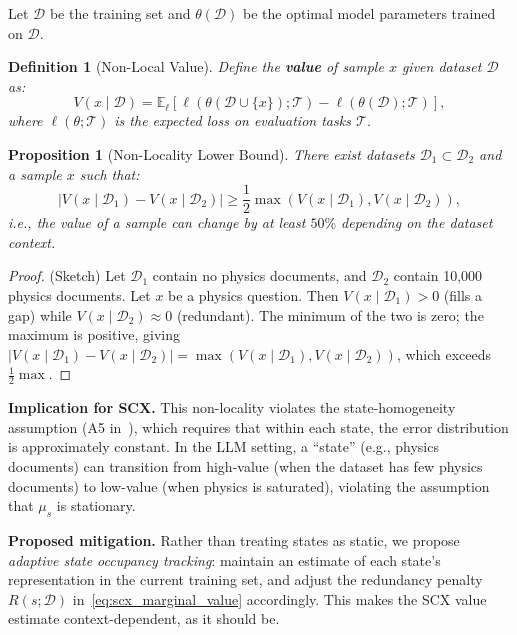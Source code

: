 \documentclass[11pt]{article}
\newtheorem{definition}{Definition}[section]
\newtheorem{proposition}{Proposition}[section]
\newcommand{\cT}{\mathcal{T}}
\begin{document}
Let $\mathcal{D}$ be the training set and $\theta(\mathcal{D})$ be the optimal model parameters trained on $\mathcal{D}$.

\begin{definition}[Non-Local Value]
Define the \textbf{value} of sample $x$ given dataset $\mathcal{D}$ as:
\begin{equation}
V(x \mid \mathcal{D}) = \mathbb{E}_{\ell}[\ell(\theta(\mathcal{D} \cup \{x\}); \cT) - \ell(\theta(\mathcal{D}); \cT)],
\label{eq:nonlocal_value}
\end{equation}
where $\ell(\theta; \cT)$ is the expected loss on evaluation tasks $\cT$.
\end{definition}

\begin{proposition}[Non-Locality Lower Bound]
There exist datasets $\mathcal{D}_1 \subset \mathcal{D}_2$ and a sample $x$ such that:
\begin{equation}
|V(x \mid \mathcal{D}_1) - V(x \mid \mathcal{D}_2)| \geq \frac{1}{2} \max(V(x \mid \mathcal{D}_1), V(x \mid \mathcal{D}_2)),
\label{eq:nonlocality_bound}
\end{equation}
i.e., the value of a sample can change by at least $50\%$ depending on the dataset context.
\end{proposition}

\begin{proof}
(Sketch) Let $\mathcal{D}_1$ contain no physics documents, and $\mathcal{D}_2$ contain 10,000 physics documents. Let $x$ be a physics question. Then $V(x \mid \mathcal{D}_1) > 0$ (fills a gap) while $V(x \mid \mathcal{D}_2) \approx 0$ (redundant). The minimum of the two is zero; the maximum is positive, giving $|V(x \mid \mathcal{D}_1) - V(x \mid \mathcal{D}_2)| = \max(V(x \mid \mathcal{D}_1), V(x \mid \mathcal{D}_2))$, which exceeds $\frac{1}{2}\max$.
\end{proof}

\textbf{Implication for SCX.} This non-locality violates the state-homogeneity assumption (A5 in~\cite{scx2026}), which requires that within each state, the error distribution is approximately constant. In the LLM setting, a ``state'' (e.g., physics documents) can transition from high-value (when the dataset has few physics documents) to low-value (when physics is saturated), violating the assumption that $\mu_s$ is stationary.

\textbf{Proposed mitigation.} Rather than treating states as static, we propose \textit{adaptive state occupancy tracking}: maintain an estimate of each state's representation in the current training set, and adjust the redundancy penalty $R(s; \mathcal{D})$ in~\eqref{eq:scx_marginal_value} accordingly. This makes the SCX value estimate context-dependent, as it should be.
\end{document}
